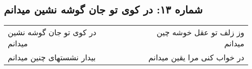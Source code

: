 \begin{center}
\section*{شماره ۱۳: در کوی تو جان گوشه نشین میدانم}
\label{sec:013}
\begin{longtable}{l p{0.5cm} r}
در کوی تو جان گوشه نشین میدانم
&&
وز زلف تو عقل خوشه چین میدانم
\\
بیدار نشستهای چنین میدانم
&&
در خواب کنی مرا یقین میدانم
\\
\end{longtable}
\end{center}
